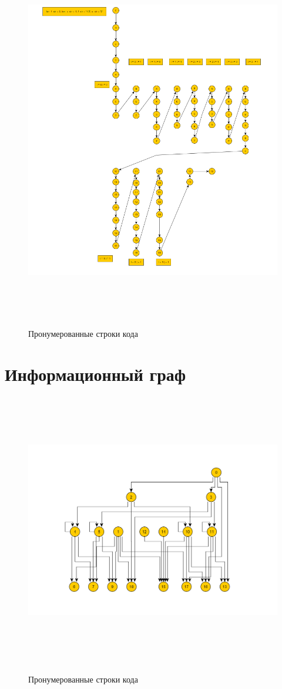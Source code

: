 \documentclass[12pt]{report}
\begin{document}
		\begin{figure}[H]	
		{\includegraphics[height = 16cm]{OI.png}}
		\caption{Пронумерованные строки кода}
	\end{figure}

	\section{Информационный граф}
		\begin{figure}[H]	
		{\includegraphics[height = 12cm]{IG.png}}
		\caption{Пронумерованные строки кода}
	\end{figure}
\end{document}
